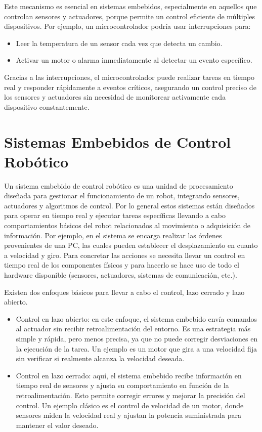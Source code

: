 Este mecanismo es esencial en sistemas embebidos, especialmente en aquellos que controlan sensores y actuadores, porque permite un control eficiente de múltiples dispositivos. Por ejemplo, un microcontrolador podría usar interrupciones para:

\begin{itemize}
    \item Leer la temperatura de un sensor cada vez que detecta un cambio.
    \item Activar un motor o alarma inmediatamente al detectar un evento específico.
\end{itemize}

Gracias a las interrupciones, el microcontrolador puede realizar tareas en tiempo real y responder rápidamente a eventos críticos, asegurando un control preciso de los sensores y actuadores sin necesidad de monitorear activamente cada dispositivo constantemente.


\section{Sistemas Embebidos de Control Robótico}
\label{sistControl}

Un sistema embebido de control robótico es una unidad de procesamiento diseñada para gestionar el funcionamiento de un robot, integrando sensores, actuadores y algoritmos de control. Por lo general estos sistemas están diseñados para operar en tiempo real y ejecutar tareas específicas llevando a cabo comportamientos básicos del robot relacionados al movimiento o adquisición de información. Por ejemplo, en \cite{paperPomponio} el sistema se encarga realizar las órdenes provenientes de una PC, las cuales pueden establecer el desplazamiento en cuanto a velocidad y giro. Para concretar las acciones se necesita llevar un control en tiempo real de los componentes físicos y para hacerlo se hace uso de todo el hardware disponible (sensores, actuadores, sistemas de comunicación, etc.).

Existen dos enfoques básicos para llevar a cabo el control, lazo cerrado y lazo abierto.

\begin{itemize}
\item Control en lazo abierto: en este enfoque, el sistema embebido envía comandos al actuador sin recibir retroalimentación del entorno. Es una estrategia más simple y rápida, pero menos precisa, ya que no puede corregir desviaciones en la ejecución de la tarea. Un ejemplo es un motor que gira a una velocidad fija sin verificar si realmente alcanza la velocidad deseada.

\item Control en lazo cerrado: aquí, el sistema embebido recibe información en tiempo real de sensores y ajusta su comportamiento en función de la retroalimentación. Esto permite corregir errores y mejorar la precisión del control. Un ejemplo clásico es el control de velocidad de un motor, donde sensores miden la velocidad real y ajustan la potencia suministrada para mantener el valor deseado.
\end{itemize}

